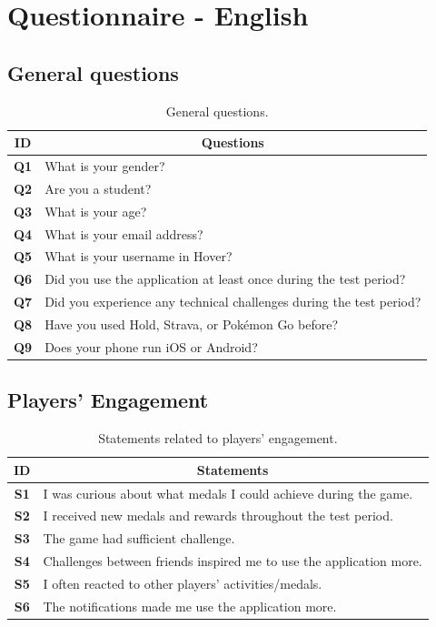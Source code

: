 \section{Questionnaire - English}
\label{appendix:questionnaire}
\subsection*{General questions} 

\begin{table}[H]
    \centering
    \begin{tabularx}{\textwidth}{|c|X|}
        \hline
        \textbf{ID} & \multicolumn{1}{c|}{\textbf{Questions}} \\ \hline
        \textbf{Q1} & What is your gender? \\
        \textbf{Q2} & Are you a student? \\
        \textbf{Q3} & What is your age? \\
        \textbf{Q4} & What is your email address? \\
        \textbf{Q5} & What is your username in Hover? \\
        \textbf{Q6} & Did you use the application at least once during the test period? \\
        \textbf{Q7} & Did you experience any technical challenges during the test period? \\
        \textbf{Q8} & Have you used Hold, Strava, or Pokémon Go before? \\ 
        \textbf{Q9} & Does your phone run iOS or Android? \\ 
        \hline
    \end{tabularx}
    \caption{General questions.}
    \label{tab:appendix_general_questions}
\end{table}

\subsection*{Players' Engagement}
\begin{table}[H]
    \centering
    \begin{tabularx}{\textwidth}{|c|X|}
        \hline
        \textbf{ID} & \multicolumn{1}{c|}{\textbf{Statements}} \\ \hline
        \textbf{S1} & I was curious about what medals I could achieve during the game. \\
        \textbf{S2} & I received new medals and rewards throughout the test period. \\
        \textbf{S3} & The game had sufficient challenge. \\
        \textbf{S4} & Challenges between friends inspired me to use the application more. \\
        \textbf{S5} & I often reacted to other players' activities/medals. \\
        \textbf{S6} & The notifications made me use the application more. \\ \hline
    \end{tabularx}
    \caption{Statements related to players' engagement.}
    \label{tab:appendix_player_engagement_statements}
\end{table}

